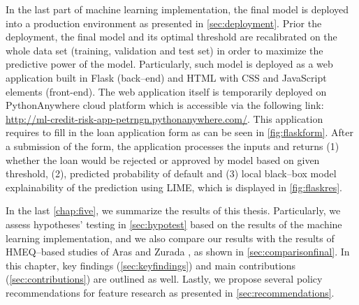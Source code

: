 In the last part of machine learning implementation, the final model is deployed into a production environment as presented in \autoref{sec:deployment}.
Prior the deployment, the final model and its optimal threshold are recalibrated on the whole data set (training, validation and test set) in order to maximize the predictive power of the model.
Particularly, such model is deployed as a web application built in Flask (back--end) and HTML with CSS and JavaScript elements (front-end).
The web application itself is temporarily deployed on PythonAnywhere cloud platform which is accessible via the following link: \url{http://ml-credit-risk-app-petrngn.pythonanywhere.com/}.
This application requires to fill in the loan application form  as can be seen in \autoref{fig:flaskform}.
After a submission of the form, the application processes the inputs and returns (1) whether the loan would be rejected or approved by model based on given threshold, (2), predicted probability of default and (3) local black--box model explainability of the prediction using LIME, which is displayed in \autoref{fig:flaskres}.


In the last \autoref{chap:five}, we summarize the results of this thesis. Particularly, we assess hypotheses' testing in \autoref{sec:hypotest} based on the results of the machine learning implementation, and we also compare our results with the results of HMEQ--based studies of Aras \citep{serkan2021bagging} and Zurada \citep{zurada2014classification}, as shown in \autoref{sec:comparisonfinal}.
In this chapter, key findings (\autoref{sec:keyfindings}) and main contributions (\autoref{sec:contributions}) are outlined as well.
Lastly, we propose several policy recommendations for feature research as presented in \autoref{sec:recommendations}.